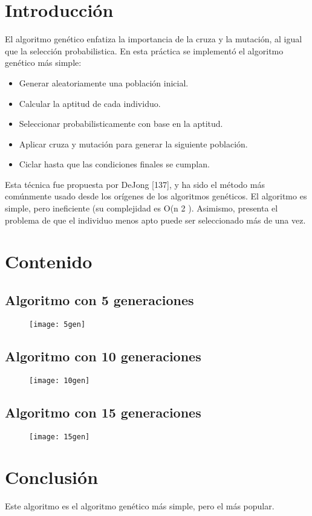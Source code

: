 \documentclass{article}
\begin{document}
\maketitle
\tableofcontents
\section{Introducción}
El algoritmo genético enfatiza la importancia de la cruza y la mutación, al igual que la selección probabilistica.
En esta práctica se implementó el algoritmo genético más simple:
\begin{itemize}
	\item Generar aleatoriamente una población inicial.
	\item Calcular la aptitud de cada individuo.
	\item Seleccionar probabilisticamente con base en la aptitud.
	\item Aplicar cruza y mutación para generar la siguiente población.
	\item Ciclar hasta que las condiciones finales se cumplan.
\end{itemize}
Esta técnica fue propuesta por DeJong [137], y ha sido el método más comúnmente
usado desde los orígenes de los algoritmos genéticos. El algoritmo es simple, pero
ineficiente (su complejidad es O(n 2 ). Asimismo, presenta el problema de que el
individuo menos apto puede ser seleccionado más de una vez.
\section{Contenido}
\subsection{Algoritmo con 5 generaciones}
\begin{figure}[h!]
	\centering
	\texttt{[image: 5gen]}
\end{figure}
\newpage
\subsection{Algoritmo con 10 generaciones}
\begin{figure}[h!]
	\centering
	\texttt{[image: 10gen]}
\end{figure}
\subsection{Algoritmo con 15 generaciones}
\begin{figure}[h!]
	\centering
	\texttt{[image: 15gen]}
\end{figure}
\section{Conclusión}
Este algoritmo es el algoritmo genético más simple, pero el más popular.
\end{document}
